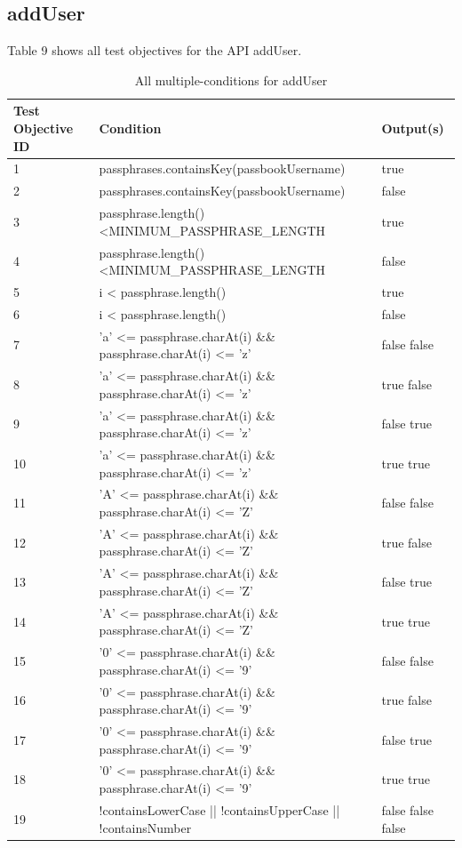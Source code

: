 \documentclass{article}
\begin{document}
\subsection{addUser}
Table 9 shows all test objectives for the API addUser.
\begin{longtable}{|p{2cm}|p{10cm}|p{3cm}|}
\caption{All multiple-conditions for addUser}\\
\hline 
Test Objective ID&Condition&Output(s)\\
\hline  
1&passphrases.containsKey(passbookUsername)&true\\
\hline
2&passphrases.containsKey(passbookUsername)&false\\
\hline
3&passphrase.length() \textless MINIMUM\_PASSPHRASE\_LENGTH&true\\
\hline
4&passphrase.length() \textless MINIMUM\_PASSPHRASE\_LENGTH&false\\
\hline
5&i < passphrase.length()&true\\
\hline
6&i < passphrase.length()&false\\
\hline
7&'a' <= passphrase.charAt(i) \&\& passphrase.charAt(i) <= 'z'&false false\\
\hline
8&'a' <= passphrase.charAt(i) \&\& passphrase.charAt(i) <= 'z'&true false\\
\hline
9&'a' <= passphrase.charAt(i) \&\& passphrase.charAt(i) <= 'z'&false true\\
\hline
10&'a' <= passphrase.charAt(i) \&\& passphrase.charAt(i) <= 'z'&true true\\
\hline
11&'A' <= passphrase.charAt(i) \&\& passphrase.charAt(i) <= 'Z'&false false\\
\hline
12&'A' <= passphrase.charAt(i) \&\& passphrase.charAt(i) <= 'Z'&true false\\
\hline
13&'A' <= passphrase.charAt(i) \&\& passphrase.charAt(i) <= 'Z'&false true\\
\hline
14&'A' <= passphrase.charAt(i) \&\& passphrase.charAt(i) <= 'Z'&true true\\
\hline
15&'0' <= passphrase.charAt(i) \&\& passphrase.charAt(i) <= '9'&false false\\
\hline
16&'0' <= passphrase.charAt(i) \&\& passphrase.charAt(i) <= '9'&true false\\
\hline
17&'0' <= passphrase.charAt(i) \&\& passphrase.charAt(i) <= '9'&false true\\
\hline
18&'0' <= passphrase.charAt(i) \&\& passphrase.charAt(i) <= '9'&true true\\
\hline
19&!containsLowerCase || !containsUpperCase || !containsNumber&false false false\\

\end{longtable}
\end{document}
